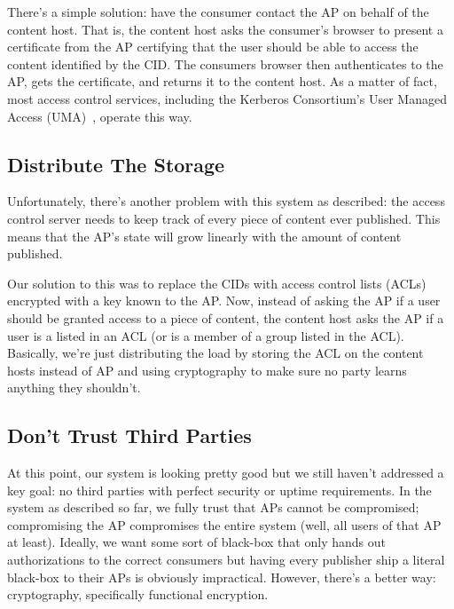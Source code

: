 \documentclass[pdftex,12pt,a4papaer]{report}
\begin{document}
There's a simple solution: have the consumer contact the AP on behalf of the
content host. That is, the content host asks the consumer's browser to present a
certificate from the AP certifying that the user should be able to access the
content identified by the CID. The consumers browser then authenticates to the
AP, gets the certificate, and returns it to the content host. As a matter of
fact, most access control services, including the Kerberos Consortium's User
Managed Access (UMA)~\cite{uma}, operate this way.


\subsection{Distribute The Storage}

Unfortunately, there's another problem with this system as described: the access
control server needs to keep track of every piece of content ever published.
This means that the AP's state will grow linearly with the amount of content
published.

Our solution to this was to replace the CIDs with access control lists (ACLs)
encrypted with a key known to the AP. Now, instead of asking the AP if a user
should be granted access to a piece of content, the content host asks the AP if
a user is a listed in an ACL (or is a member of a group listed in the ACL).
Basically, we're just distributing the load by storing the ACL on the content
hosts instead of AP and using cryptography to make sure no party learns anything
they shouldn't.

\subsection{Don't Trust Third Parties}

At this point, our system is looking pretty good but we still haven't addressed
a key goal: no third parties with perfect security or uptime requirements. In
the system as described so far, we fully trust that APs cannot be compromised;
compromising the AP compromises the entire system (well, all users of that AP at
least). Ideally, we want some sort of black-box that only hands out
authorizations to the correct consumers but having every publisher ship a
literal black-box to their APs is obviously impractical. However, there's a
better way: cryptography, specifically functional encryption.
\end{document}
